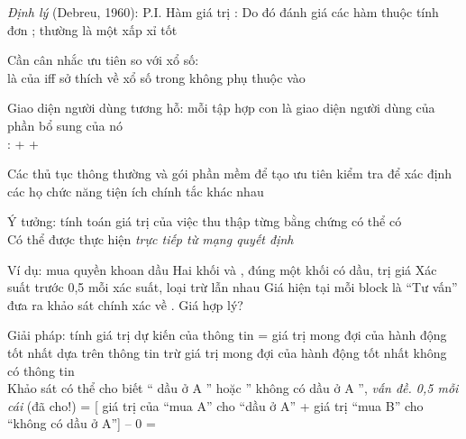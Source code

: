 \documentclass{article}
\begin{document}
\begin{huge}
\emph{Định lý} (Debreu, 1960): P.I. Hàm giá trị \mat{$\implies$} \mat{$\exists$} :
\mat{\[
  V(S) = \mysum_i V_i(X_i(S))
\]}
Do đó đánh giá các hàm thuộc tính đơn ; thường là một xấp xỉ tốt



Cần cân nhắc ưu tiên so với xổ số:\\
 là  của  iff\al
  sở thích về xổ số trong  không phụ thuộc vào 

Giao diện người dùng tương hỗ: mỗi tập hợp con là giao diện người dùng của phần bổ sung của nó\\
\mat{$\implies$} \mat{$\exists$} : \al
{}\nl
 + \nl
 + 

Các thủ tục thông thường và gói phần mềm để tạo ưu tiên
kiểm tra để xác định các họ chức năng tiện ích chính tắc khác nhau



Ý tưởng: tính toán giá trị của việc thu thập từng bằng chứng có thể có \\
Có thể được thực hiện \emph{trực tiếp từ mạng quyết định}

Ví dụ: mua quyền khoan dầu\al
  Hai khối  và , đúng một khối có dầu, trị giá \al
  Xác suất trước 0,5 mỗi xác suất, loại trừ lẫn nhau\al
  Giá hiện tại mỗi block là \al
  ``Tư vấn'' đưa ra khảo sát chính xác về . Giá hợp lý?

Giải pháp: tính giá trị dự kiến của thông tin\al
  = giá trị mong đợi của hành động tốt nhất dựa trên thông tin\nl
    trừ giá trị mong đợi của hành động tốt nhất không có thông tin\\
Khảo sát có thể cho biết `` dầu ở A '' hoặc '' không có dầu ở A '', \emph{vấn đề. 0,5 mỗi cái} (đã cho!)\al
  = [\mat{$0.5 \times {}$} giá trị của ``mua A'' cho ``dầu ở A''\nl
    + \mat{$0.5 \times {}$} giá trị ``mua B'' cho ``không có dầu ở A'']\nl
    -- 0\al
  = 





\end{huge}
\end{document}
